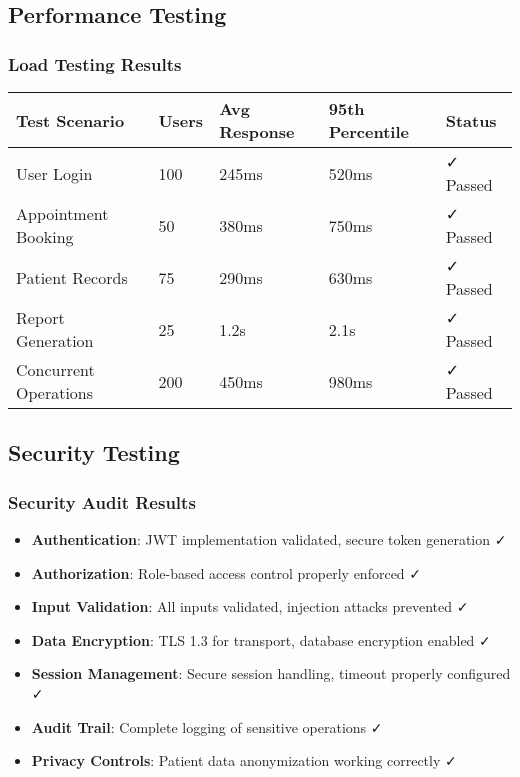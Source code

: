 \documentclass[12pt,a4paper]{article}
\begin{document}
\subsection{Performance Testing}

\subsubsection{Load Testing Results}
\begin{longtable}{|p{3cm}|p{2cm}|p{2cm}|p{2cm}|p{3cm}|}
\hline
\textbf{Test Scenario} & \textbf{Users} & \textbf{Avg Response} & \textbf{95th Percentile} & \textbf{Status} \\
\hline
User Login & 100 & 245ms & 520ms & ✓ Passed \\
\hline
Appointment Booking & 50 & 380ms & 750ms & ✓ Passed \\
\hline
Patient Records & 75 & 290ms & 630ms & ✓ Passed \\
\hline
Report Generation & 25 & 1.2s & 2.1s & ✓ Passed \\
\hline
Concurrent Operations & 200 & 450ms & 980ms & ✓ Passed \\
\hline
\end{longtable}

\subsection{Security Testing}

\subsubsection{Security Audit Results}
\begin{itemize}
    \item \textbf{Authentication}: JWT implementation validated, secure token generation ✓
    \item \textbf{Authorization}: Role-based access control properly enforced ✓
    \item \textbf{Input Validation}: All inputs validated, injection attacks prevented ✓
    \item \textbf{Data Encryption}: TLS 1.3 for transport, database encryption enabled ✓
    \item \textbf{Session Management}: Secure session handling, timeout properly configured ✓
    \item \textbf{Audit Trail}: Complete logging of sensitive operations ✓
    \item \textbf{Privacy Controls}: Patient data anonymization working correctly ✓
\end{itemize}
\end{document}
